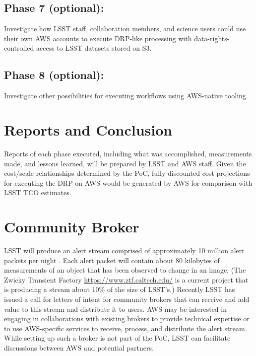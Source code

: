 \subsection{Phase 7 (optional):} \label{sec:phase-7}
Investigate how LSST staff, collaboration members, and science users could use their own AWS accounts to execute DRP-like processing with data-rights-controlled access to LSST datasets stored on S3.

\subsection{Phase 8 (optional):} \label{sec:phase-8}
Investigate other possibilities for executing workflows using AWS-native tooling.

\section{Reports and Conclusion} \label{sec:reports}
Reports of each phase executed, including what was accomplished, measurements made, and lessons learned, will be prepared by LSST and AWS staff.
Given the cost/scale relationships determined by the PoC, fully discounted cost projections for executing the DRP on AWS would be generated by AWS for comparison with LSST TCO estimates.

\section{Community Broker} \label{sec:broker}
LSST will produce an alert stream comprised of approximately 10 million alert packets per night .
Each alert packet will contain about 80 kilobytes of measurements of an object that has been observed to change in an image.
(The Zwicky Transient Factory \href{ZTF}{https://www.ztf.caltech.edu/} is a current project that is producing a stream about 10\% of the size of LSST's.)
Recently LSST has issued a call for letters of intent for community brokers  that can receive and add value to this stream and distribute it to users.
AWS may be interested in engaging in collaborations with existing brokers to provide technical expertise or to use AWS-specific services to receive, process, and distribute the alert stream.
While setting up such a broker is not part of the PoC, LSST can facilitate discussions between AWS and potential partners.
